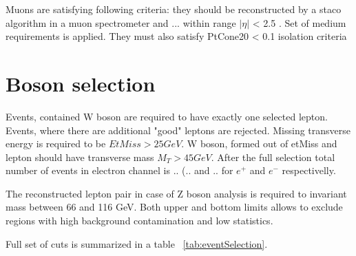 Muons are satisfying following criteria: they should be reconstructed by a staco algorithm in a muon spectrometer and ... within range $|\eta|$ < 2.5 . Set of medium requirements is applied. They must also satisfy PtCone20 < 0.1 isolation criteria

\section{Boson selection}
Events, contained W boson are required to have exactly one selected lepton. Events, where there are additional "good" leptons are rejected. Missing transverse energy is required to be $EtMiss>25 GeV$.  W boson, formed out of etMiss and lepton should have transverse mass $M_T > 45 GeV$. After the full selection total number of events in electron channel is .. (.. and .. for $e^+$ and $e^-$ respectivelly. 

The reconstructed lepton pair in case of Z boson analysis is required to invariant mass between 66 and 116 GeV. Both upper and bottom limits allows to exclude regions with high background contamination and low statistics. 

Full set of cuts is summarized in a table ~\ref{tab:eventSelection}.



